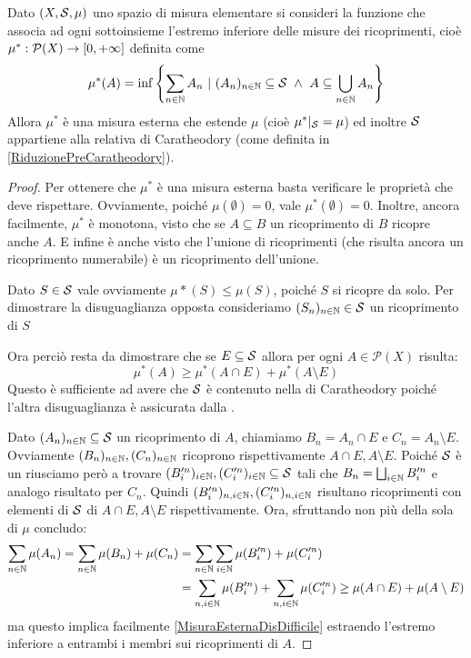 \begin{proposition}\label{MisuraEsternaDiPremisura}
	Dato $(X,\S,\mu)$ uno spazio di misura elementare si consideri la funzione che associa ad ogni sottoinsieme l'estremo inferiore delle misure dei ricoprimenti, cioè $\mu^*:\mathcal P(X)\to\Rpiu$ definita come 
	\begin{equation*}
		\mu^*(A)=\inf\left\{\sum_{n\in\N} A_n\ |\ (A_n)_{n\in\N}\subseteq\S\ \wedge
		\ A\subseteq\bigcup_{n\in\N}A_n\right\}
	\end{equation*}
	Allora $\mu^*$ è una misura esterna che estende $\mu$ (cioè $\mu^*|_\S=\mu$) ed inoltre $\S$ appartiene alla relativa \sigalg{} di Caratheodory (come definita in \cref{RiduzionePreCaratheodory}).
\end{proposition}
\begin{proof}
	Per ottenere che $\mu^*$ è una misura esterna basta verificare le proprietà che deve rispettare.
	Ovviamente, poiché $\mu(\emptyset)=0$, vale $\mu^*(\emptyset)=0$. 
	Inoltre, ancora facilmente, $\mu^*$ è monotona, visto che se $A\subseteq B$ un ricoprimento di $B$ ricopre anche $A$.
	E infine è anche \sigsubadd{} visto che l'unione di ricoprimenti (che risulta ancora un ricoprimento numerabile) è un ricoprimento dell'unione.
	
	Dato $S\in\S$ vale ovviamente $\mu*(S)\le\mu(S)$, poiché $S$ si ricopre da solo. Per dimostrare la disuguaglianza opposta consideriamo $(S_n)_{n\in\N}\in \S$ un ricoprimento di $S$
	
	Ora perciò resta da dimostrare che se $E\subseteq \S$ allora per ogni $A\in\mathcal P(X)$ risulta:
	\begin{equation}\label{MisuraEsternaDisDifficile}
		\mu^*(A) \ge \mu^*(A\cap E)+\mu^*(A\setminus E)
	\end{equation}
	Questo è sufficiente ad avere che $\S$ è contenuto nella \sigalg{} di Caratheodory poiché l'altra disuguaglianza è assicurata dalla \sigsubadd[ità].
	
	Dato $(A_n)_{n\in\N}\subseteq\S$ un ricoprimento di $A$, chiamiamo $B_n=A_n\cap E$ e $C_n=A_n\setminus E$. Ovviamente $(B_n)_{n\in\N},(C_n)_{n\in\N}$ ricoprono rispettivamente $A\cap E,A\setminus E$. Poiché $\S$ è un \semiring{} riusciamo però a trovare $(B'^n_i)_{i\in\N},(C'^n_i)_{i\in\N} \subseteq \S$ tali che $B_n=\bigsqcup_{i\in\N}B'^n_i$ e analogo risultato per $C_n$. Quindi $(B'^n_i)_{n,i\in\N}, (C'^n_i)_{n,i\in\N}$ risultano ricoprimenti con elementi di $\S$ di $A\cap E,A\setminus E$ rispettivamente.
	Ora, sfruttando non più della sola \sigadd[ità] di $\mu$ concludo:
	\begin{align*}
		\sum_{n\in\N}\mu(A_n)=\sum_{n\in\N} \mu(B_n)+\mu(C_n)&=
		\sum_{n\in\N}\sum_{i\in\N}\mu(B'^n_i)+\mu(C'^n_i)\\
		&=
		\sum_{n,i\in\N}\mu(B'^n_i)+\sum_{n,i\in\N}\mu(C'^n_i)\ge \mu(A\cap E)+\mu(A\setminus E)
	\end{align*}
	ma questo implica facilmente \cref{MisuraEsternaDisDifficile} estraendo l'estremo inferiore a entrambi i membri sui ricoprimenti di $A$.
\end{proof}

